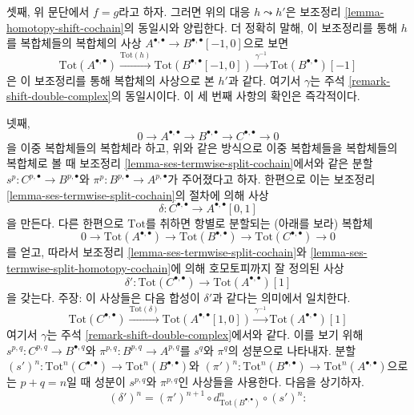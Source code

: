 \begin{remark}
\medskip\noindent
셋째, 위 문단에서 $f = g$라고 하자. 그러면 위의 대응
$h \leadsto h'$은 보조정리 \ref{lemma-homotopy-shift-cochain}의
동일시와 양립한다. 더 정확히 말해, 이 보조정리를 통해 $h$를
복합체들의 복합체의 사상
$A^{\bullet, \bullet} \to B^{\bullet, \bullet}[-1, 0]$으로 보면
$$
\text{Tot}(A^{\bullet, \bullet})
\xrightarrow{\text{Tot}(h)}
\text{Tot}(B^{\bullet, \bullet}[-1, 0])
\xrightarrow{\gamma^{-1}}
\text{Tot}(B^{\bullet, \bullet})[-1]
$$
은 이 보조정리를 통해 복합체의 사상으로 본 $h'$과 같다.
여기서 $\gamma$는 주석 \ref{remark-shift-double-complex}의
동일시이다. 이 세 번째 사항의 확인은 즉각적이다.

\medskip\noindent
넷째,
$$
0 \to A^{\bullet, \bullet} \to B^{\bullet, \bullet} \to
C^{\bullet, \bullet} \to 0
$$
을 이중 복합체들의 복합체라 하고, 위와 같은 방식으로 이중 복합체들을
복합체들의 복합체로 볼 때 보조정리
\ref{lemma-ses-termwise-split-cochain}에서와 같은 분할
$s^p : C^{p, \bullet} \to B^{p, \bullet}$와
$\pi^p : B^{p, \bullet} \to A^{p, \bullet}$가 주어졌다고 하자.
한편으로 이는 보조정리 \ref{lemma-ses-termwise-split-cochain}의
절차에 의해 사상
$$
\delta : C^{\bullet, \bullet} \longrightarrow A^{\bullet, \bullet}[0, 1]
$$
을 만든다. 다른 한편으로 $\text{Tot}$를 취하면 항별로 분할되는
(아래를 보라) 복합체
$$
0 \to \text{Tot}(A^{\bullet, \bullet}) \to
\text{Tot}(B^{\bullet, \bullet}) \to
\text{Tot}(C^{\bullet, \bullet}) \to 0
$$
를 얻고, 따라서 보조정리 \ref{lemma-ses-termwise-split-cochain}와
\ref{lemma-ses-termwise-split-homotopy-cochain}에 의해 호모토피까지
잘 정의된 사상
$$
\delta' :
\text{Tot}(C^{\bullet, \bullet})
\longrightarrow
\text{Tot}(A^{\bullet, \bullet})[1]
$$
을 갖는다. 주장: 이 사상들은 다음 합성이 $\delta'$과 같다는 의미에서
일치한다.
$$
\text{Tot}(C^{\bullet, \bullet})
\xrightarrow{\text{Tot}(\delta)}
\text{Tot}(A^{\bullet, \bullet}[1, 0]) \xrightarrow{\gamma^{-1}}
\text{Tot}(A^{\bullet, \bullet})[1]
$$
여기서 $\gamma$는 주석 \ref{remark-shift-double-complex}에서와 같다.
이를 보기 위해
$s^{p, q} : C^{p, q} \to B^{\bullet, q}$와
$\pi^{p, q} : B^{p, q} \to A^{p, q}$를 $s^q$와 $\pi^q$의 성분으로
나타내자. 분할
$(s')^n : \text{Tot}^n(C^{\bullet, \bullet}) \to
\text{Tot}^n(B^{\bullet, \bullet})$와
$(\pi')^n : \text{Tot}^n(B^{\bullet, \bullet}) \to
\text{Tot}^n(A^{\bullet, \bullet})$으로는 $p + q = n$일 때 성분이
$s^{p, q}$와 $\pi^{p, q}$인 사상들을 사용한다. 다음을 상기하자.
$$
(\delta')^n =
(\pi')^{n + 1} \circ d_{\text{Tot}(B^{\bullet, \bullet})}^n \circ (s')^n :
$$
\end{remark}
